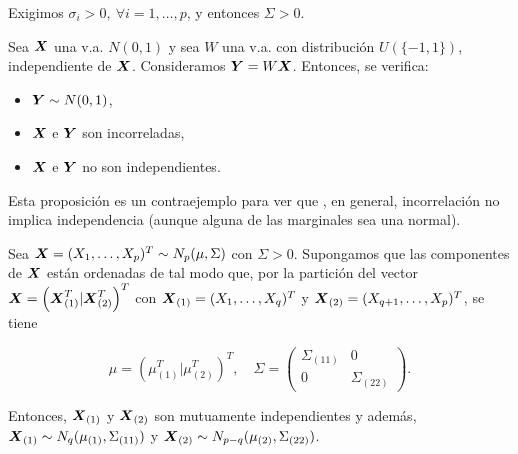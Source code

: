   \begin{nota}
Exigimos $\sigma_i > 0, \ \forall i = 1,\dots, p$, y entonces $\Sigma > 0$.
  \end{nota}

  \begin{nprop}
    Sea $\boldsymbol{X}$ una v.a. $N(0,1)$ y sea $W$ una v.a. con distribución $U(\{-1,1\})$, independiente de $\boldsymbol{X}$. Consideramos $\boldsymbol{Y} = W\boldsymbol{X}$. Entonces, se verifica:
    \begin{itemize}
    \item $\boldsymbol{Y} \sim N(0,1)$,
    \item $\boldsymbol{X}$ e $\boldsymbol{Y}$ son incorreladas,
      \item $\boldsymbol{X}$ e $\boldsymbol{Y}$ no son independientes. 
    \end{itemize}

  \end{nprop}
  Esta proposición es un contraejemplo para ver que , en general, incorrelación no implica independencia (aunque alguna de las marginales sea una normal).

  \begin{nth} \label{independenciacovbloques}
    Sea $\boldsymbol{X} = (X_1, \dots ,X_p)^T \sim N_p(\mu,\Sigma)$ con $\Sigma > 0$. Supongamos que las componentes de $\boldsymbol{X}$ están ordenadas de tal modo que, por la partición del vector $\boldsymbol{X} = \left(\boldsymbol{X}_{(1)}^T | \boldsymbol{X}_{(2)}^T\right)^T$ con $\boldsymbol{X}_{(1)} = (X_1,\dots,X_q)^T$ y $\boldsymbol{X}_{(2)} = (X_{q+1},\dots,X_p)^T$, se tiene
    
    \[
    \mu = \left(\mu_{(1)}^T | \mu_{(2)}^T\right)^T, \quad \Sigma = \begin{pmatrix} \Sigma_{(11)} & 0 \\ 0 & \Sigma_{(22)} \end{pmatrix}
    .\]
    
    Entonces, $\boldsymbol{X}_{(1)}$ y $\boldsymbol{X}_{(2)}$ son mutuamente independientes y además, $\boldsymbol{X}_{(1)} \sim N_q(\mu_{(1)}, \Sigma_{(11)})$ y $\boldsymbol{X}_{(2)} \sim N_{p-q}(\mu_{(2)}, \Sigma_{(22)})$.
  \end{nth}


